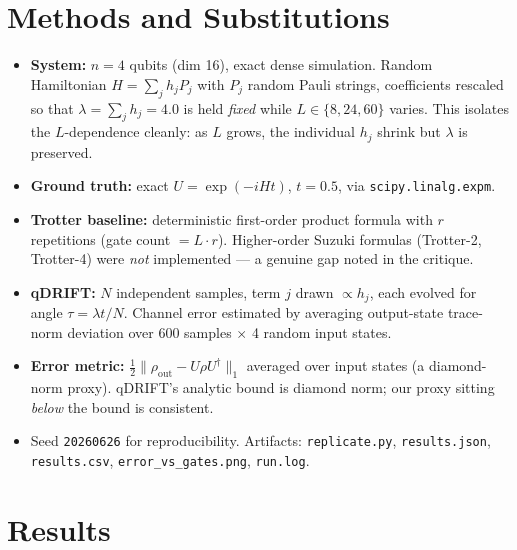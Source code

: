 \documentclass[11pt]{article}
\begin{document}
\section{Methods and Substitutions}
\begin{itemize}
  \item \textbf{System:} $n = 4$ qubits (dim 16), exact dense simulation.
        Random Hamiltonian $H = \sum_j h_j P_j$ with $P_j$ random Pauli
        strings, coefficients rescaled so that $\lambda = \sum_j h_j = 4.0$
        is held \emph{fixed} while $L \in \{8, 24, 60\}$ varies. This
        isolates the $L$-dependence cleanly: as $L$ grows, the individual
        $h_j$ shrink but $\lambda$ is preserved.
  \item \textbf{Ground truth:} exact $U = \exp(-iHt)$, $t = 0.5$, via
        \texttt{scipy.linalg.expm}.
  \item \textbf{Trotter baseline:} deterministic first-order product formula
        with $r$ repetitions (gate count $= L \cdot r$). Higher-order
        Suzuki formulas (Trotter-2, Trotter-4) were \emph{not} implemented ---
        a genuine gap noted in the critique.
  \item \textbf{qDRIFT:} $N$ independent samples, term $j$ drawn
        $\propto h_j$, each evolved for angle $\tau = \lambda t / N$. Channel
        error estimated by averaging output-state trace-norm deviation over
        600 samples $\times$ 4 random input states.
  \item \textbf{Error metric:} $\tfrac{1}{2} \| \rho_{\mathrm{out}}
        - U \rho U^{\dagger} \|_{1}$ averaged over input states (a
        diamond-norm proxy). qDRIFT's analytic bound is diamond norm; our
        proxy sitting \emph{below} the bound is consistent.
  \item Seed \texttt{20260626} for reproducibility. Artifacts:
        \texttt{replicate.py}, \texttt{results.json}, \texttt{results.csv},
        \texttt{error\_vs\_gates.png}, \texttt{run.log}.
\end{itemize}

\section{Results}
\end{document}
